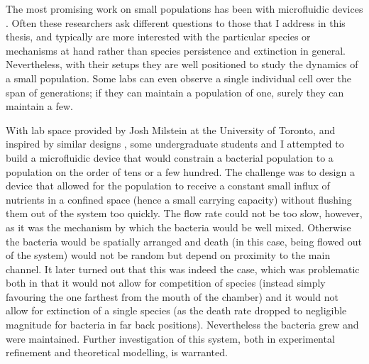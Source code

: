 The most promising work on small populations has been with microfluidic devices \cite{Wheeler2003,Wang2010,Grunberger2014,others???}. 
Often these researchers ask different questions to those that I address in this thesis, and typically are more interested with the particular species or mechanisms at hand rather than species persistence and extinction in general. 
Nevertheless, with their setups they are well positioned to study the dynamics of a small population. 
Some labs can even observe a single individual cell over the span of generations; if they can maintain a population of one, surely they can maintain a few. 

With lab space provided by Josh Milstein at the University of Toronto, and inspired by similar designs \cite{???}, some undergraduate students and I attempted to build a microfluidic device that would constrain a bacterial population to a population on the order of tens or a few hundred. 
The challenge was to design a device that allowed for the population to receive a constant small influx of nutrients in a confined space (hence a small carrying capacity) without flushing them out of the system too quickly. 
The flow rate could not be too slow, however, as it was the mechanism by which the bacteria would be well mixed. 
Otherwise the bacteria would be spatially arranged and death (in this case, being flowed out of the system) would not be random but depend on proximity to the main channel. 
It later turned out that this was indeed the case, which was problematic both in that it would not allow for competition of species (instead simply favouring the one farthest from the mouth of the chamber) and it would not allow for extinction of a single species (as the death rate dropped to negligible magnitude for bacteria in far back positions). 
Nevertheless the bacteria grew and were maintained. Further investigation of this system, both in experimental refinement and theoretical modelling, is warranted. 

\iffalse
\begin{figure}
\centering
\texttt{[image: microfluidicDesign]}
\caption{words words and more words} \label{microfluidic} %
\end{figure}
\fi

